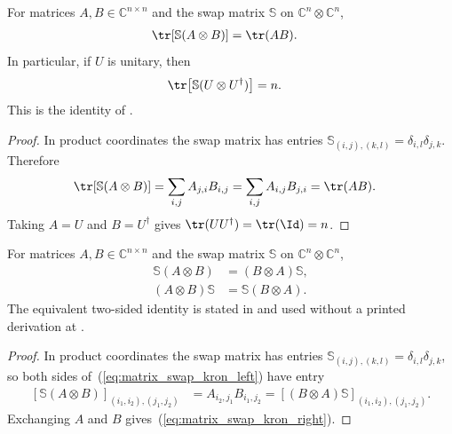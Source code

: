 \begin{lemma}
    \label{lem:matrix_trace_swap_kronecker}
    \leanok
    For matrices $A,B\in\mathbb C^{n\times n}$ and the swap matrix
    $\mathbb S$ on $\mathbb C^n\otimes\mathbb C^n$,
    \begin{align}
        \tr\!\left[\mathbb S(A\otimes B)\right] & =\tr(AB).
    \end{align}
    In particular, if $U$ is unitary, then
    \begin{align}
        \tr\!\left[\mathbb S(U\otimes U^\dagger)\right] & =n.
    \end{align}
    This is the identity of \cite[lines~1608--1610]{Cirac2017MPU}.
\end{lemma}

\begin{proof}\leanok
    In product coordinates the swap matrix has entries
    $\mathbb S_{(i,j),(k,l)}=\delta_{i,l}\delta_{j,k}$. Therefore
    \begin{align}
        \tr\!\left[\mathbb S(A\otimes B)\right]
         & =\sum_{i,j}A_{j,i}B_{i,j}
        =\sum_{i,j}A_{i,j}B_{j,i}
        =\tr(AB).
    \end{align}
    Taking $A=U$ and $B=U^\dagger$ gives
    $\tr(UU^\dagger)=\tr(\Id)=n$.
\end{proof}

\begin{lemma}
    \label{thm:matrix_swap_kronecker_intertwine}
    \leanok
    For matrices $A,B\in\mathbb C^{n\times n}$ and the swap matrix
    $\mathbb S$ on $\mathbb C^n\otimes\mathbb C^n$,
    \begin{align}
        \mathbb S(A\otimes B) & =(B\otimes A)\mathbb S,
        \label{eq:matrix_swap_kron_left}                \\
        (A\otimes B)\mathbb S & =\mathbb S(B\otimes A).
        \label{eq:matrix_swap_kron_right}
    \end{align}
    The equivalent two-sided identity is stated in
    \cite[lines~1316--1319]{Cirac2017MPU} and used without a printed
    derivation at \cite[lines~1624--1630]{Cirac2017MPU}.
\end{lemma}

\begin{proof}\leanok
    In product coordinates the swap matrix has entries
    $\mathbb S_{(i,j),(k,l)}=\delta_{i,l}\delta_{j,k}$, so both sides
    of~(\ref{eq:matrix_swap_kron_left}) have entry
    \begin{align}
        \left[\mathbb S(A\otimes B)\right]_{(i_1,i_2),(j_1,j_2)}
         & =A_{i_2,j_1}B_{i_1,j_2}
        =\left[(B\otimes A)\mathbb S\right]_{(i_1,i_2),(j_1,j_2)}.
    \end{align}
    Exchanging $A$ and $B$ gives~(\ref{eq:matrix_swap_kron_right}).
\end{proof}

